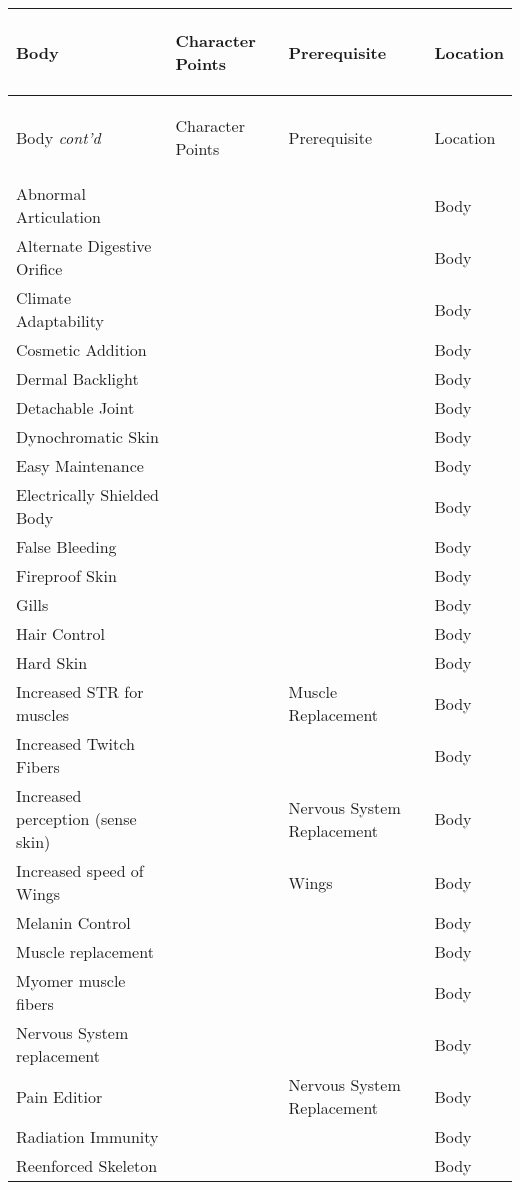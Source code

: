 \documentclass[twoside]{book}
\begin{document}
\begin{longtable}{p{1.25in}p{2em}ll} 
  Body& \begin{turn}{70}{Character Points}\end{turn}
          & \begin{turn}{70}{Prerequisite}\end{turn}
          & \begin{turn}{70}{Location}\end{turn}
          \\
  \hline
  \hline
  \endfirsthead
  Body \textit{cont'd}
        & \begin{turn}{70}{Character Points}\end{turn}
          & \begin{turn}{70}{Prerequisite}\end{turn}
          & \begin{turn}{70}{Location}\end{turn}
           \\
  \hline
  \endhead
\raggedright Abnormal Articulation&&&Body\tabularnewline
      \raggedright Alternate Digestive Orifice&&&Body\tabularnewline
      \raggedright Climate Adaptability&&&Body\tabularnewline
      \raggedright Cosmetic Addition&&&Body\tabularnewline
      \raggedright Dermal Backlight&&&Body\tabularnewline
      \raggedright Detachable Joint&&&Body\tabularnewline
      \raggedright Dynochromatic Skin&&&Body\tabularnewline
      \raggedright Easy Maintenance&&&Body\tabularnewline
      \raggedright Electrically Shielded Body&&&Body\tabularnewline
      \raggedright False Bleeding&&&Body\tabularnewline
      \raggedright Fireproof Skin&&&Body\tabularnewline
      \raggedright Gills&&&Body\tabularnewline
      \raggedright Hair Control&&&Body\tabularnewline
      \raggedright Hard Skin&&&Body\tabularnewline
      \raggedright Increased STR for muscles&&Muscle Replacement&Body\tabularnewline
      \raggedright Increased Twitch Fibers&&&Body\tabularnewline
      \raggedright Increased perception (sense skin)&&Nervous System Replacement&Body\tabularnewline
      \raggedright Increased speed of Wings&&Wings&Body\tabularnewline
      \raggedright Melanin Control&&&Body\tabularnewline
      \raggedright Muscle replacement&&&Body\tabularnewline
      \raggedright Myomer muscle fibers&&&Body\tabularnewline
      \raggedright Nervous System replacement&&&Body\tabularnewline
      \raggedright Pain Editior&&Nervous System Replacement&Body\tabularnewline
      \raggedright Radiation Immunity&&&Body\tabularnewline
      \raggedright Reenforced Skeleton&&&Body\tabularnewline

\end{longtable}
\end{document}
